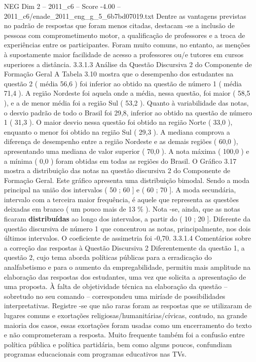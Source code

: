 \begin{textsample}{NEG Dim 2 – 2011\_c6 – Score -4.00 – 2011\_c6/enade\_2011\_eng\_g\_5\_6b7bd07019.txt}
Dentre as vantagens previstas no padrão de respostas que foram menos citadas, destacam -se a inclusão de pessoas com comprometimento motor, a qualificação de professores e a troca de experiências entre os participantes.
Foram muito comuns, no entanto, as menções à supostamente maior facilidade de acesso a professores ou/e tutores em cursos superiores a distância. 3.3.1.3 Análise da Questão Discursiva 2 do Componente de Formação Geral A Tabela 3.10 mostra que o desempenho dos estudantes na questão 2 ( média 56,6 ) foi inferior ao obtido na questão de número 1 ( média 71,4 ).
A região Nordeste foi aquela onde a média, nessa questão, foi maior ( 58,5 ), e a de menor média foi a região Sul ( 53,2 ).
Quanto à variabilidade das notas, o desvio padrão de todo o Brasil foi 29,8, inferior ao obtido na questão de número 1 ( 31,3 ).
O maior desvio nessa questão foi obtido na região Norte ( 33,0 ), enquanto o menor foi obtido na região Sul ( 29,3 ).
A mediana comprova a diferença de desempenho entre a região Nordeste e as demais regiões ( 60,0 ), apresentando uma mediana de valor superior ( 70,0 ).
A nota máxima ( 100,0 ) e a mínima ( 0,0 ) foram obtidas em todas as regiões do Brasil.
O Gráfico 3.17 mostra a distribuição das notas na questão discursiva 2 do Componente de Formação Geral.
Este gráfico apresenta uma distribuição bimodal.
Sendo a moda principal na união dos intervalos ( 50 ; 60 ] e ( 60 ; 70 ].
A moda secundária, intervalo com a terceira maior frequência, é aquele que representa as questões deixadas em branco ( um pouco mais de 13 \% ).
Nota -se, ainda, que as notas ficaram \textbf{distribuídas} ao longo dos intervalos, a partir do ( 10 ; 20 ].
Diferente da questão discursiva de número 1 que concentrou as notas, principalmente, nos dois últimos intervalos.
O coeficiente de assimetria foi -0,70. 3.3.1.4 Comentários sobre a correção das respostas à Questão Discursiva 2 Diferentemente da questão 1, a questão 2, cujo tema aborda políticas públicas para a erradicação do analfabetismo e para o aumento da empregabilidade, permitiu mais amplitude na elaboração das respostas dos estudantes, uma vez que solicita a apresentação de uma proposta.
À falta de objetividade técnica na elaboração da questão – sobretudo no seu comando – correspondeu uma miríade de possibilidades interpretativas.
Registre -se que não raras foram as respostas que se utilizaram de lugares comuns e exortações religiosas/humanitárias/cívicas, contudo, na grande maioria dos casos, essas exortações foram usadas como um encerramento do texto e não comprometeram a resposta.
Muito frequente também foi a confusão entre política pública e política partidária, bem como alguns poucos, confundiam programas educacionais com programas educativos nas TVs.

\end{textsample}
